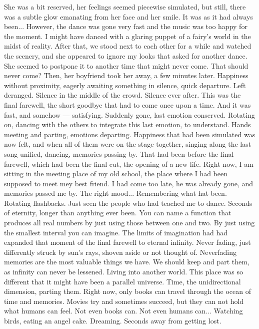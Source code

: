 She was a bit reserved, her feelings seemed piecewise simulated, but still, there was a subtle glow emanating from her face and her smile. It was as it had always been... 
However, the dance was gone very fast and the music was too happy for the moment. I might have danced with a glaring puppet of a fairy's world in the midst of reality. 
After that, we stood next to each other for a while and watched the scenery, and she appeared to ignore my looks that asked for another dance. She seemed to postpone it to another time that might never come. That should never come? 
Then, her boyfriend took her away, a few minutes later. 
Happiness without proximity, eagerly awaiting something in silence, quick departure. Left deranged. 
Silence in the middle of the crowd. 
Silence ever after. 
This was the final farewell, the short goodbye that had to come once upon a time. And it was fast, and somehow --- satisfying. Suddenly gone, last emotion conserved. 
Rotating on, dancing with the others to integrate this last emotion, to understand. 
Hands meeting and parting, emotions departing. Happiness that had been simulated was now felt, and when all of them were on the stage together, singing along the last song unified, dancing, memories passing by. That had been before the final farewell, which had been the final cut, the opening of a new life. 
Right now, I am sitting in the meeting place of my old school, the place where I had been supposed to meet mey best friend. I had come too late, he was already gone, and memories passed me by. The right mood... 
Remembering what hat been. Rotating flashbacks. Just seen the people who had teached me to dance. 
Seconds of eternity, longer than anything ever been. You can name a function that produces all real numbers by just using those between one and two. By just using the smallest interval you can imagine. 
The limits of imagination had had expanded that moment of the final farewell to eternal infinity. Never fading, just differently struck by sun's rays, shoven aside or not thought of. 
Neverfading memories are the most valuable things we have. We should keep and part them, as infinity can never be lessened. 
Living into another world. This place was so different that it might have been a parallel universe. Time, the unidirectional dimension, parting them. 
Right now, only books can travel through the ocean of time and memories. Movies try and sometimes succeed, but they can not hold what humans can feel. Not even books can. Not even humans can... 
Watching birds, eating an angel cake. Dreaming. Seconds away from getting lost. 
